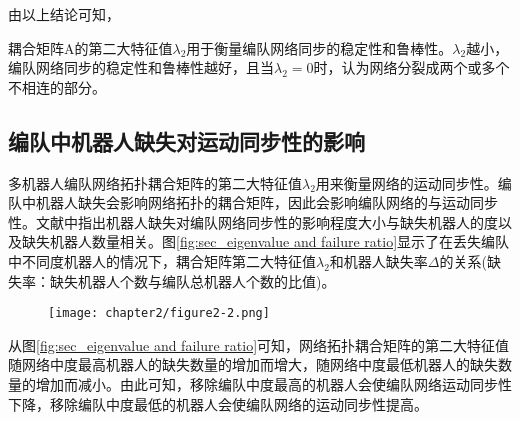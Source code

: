 由以上结论可知，
\begin{lem}
\label{lem:lambda2}
	耦合矩阵A的第二大特征值$\lambda_2$用于衡量编队网络同步的稳定性和鲁棒性。$\lambda_2$越小，编队网络同步的稳定性和鲁棒性越好，且当$\lambda_2 = 0$时，认为网络分裂成两个或多个不相连的部分\supercite{li2003synchronization}。
\end{lem}

\subsection{编队中机器人缺失对运动同步性的影响}
多机器人编队网络拓扑耦合矩阵的第二大特征值$\lambda_2$用来衡量网络的运动同步性。编队中机器人缺失会影响网络拓扑的耦合矩阵，因此会影响编队网络的与运动同步性。文献\parencite{张飞2008移动机器人覆盖问题的研究}中指出机器人缺失对编队网络同步性的影响程度大小与缺失机器人的度以及缺失机器人数量相关。图\ref{fig:sec_eigenvalue and failure ratio}显示了在丢失编队中不同度机器人的情况下，耦合矩阵第二大特征值$\lambda_2$和机器人缺失率$\Delta$的关系(缺失率：缺失机器人个数与编队总机器人个数的比值)。
\begin{figure}[!htbp]
	\centering
	\texttt{[image: chapter2/figure2-2.png]}
\end{figure}
从图\ref{fig:sec_eigenvalue and failure ratio}可知，网络拓扑耦合矩阵的第二大特征值随网络中度最高机器人的缺失数量的增加而增大，随网络中度最低机器人的缺失数量的增加而减小。由此可知，移除编队中度最高的机器人会使编队网络运动同步性下降，移除编队中度最低的机器人会使编队网络的运动同步性提高。

